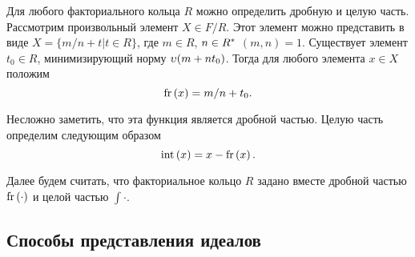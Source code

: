 \documentclass[_00_dissertation.tex]{subfiles}
\begin{document}
\begin{remark}\label{remark:easy_fr}
    Для любого факториального кольца $R$ можно определить дробную и целую часть.
    Рассмотрим произвольный элемент $X \in F/R$.
    Этот элемент можно представить в виде $X = \{m/n + t | t \in R\}$, где $m \in R$, $n \in R^{*}$ $(m, n) = 1$.
    Существует элемент $t_0 \in R$, минимизирующий норму $\upsilon(m + n t_0)$.
    Тогда для любого элемента $x \in X$ положим
    \begin{equation*}
        \textrm{fr}\left(x\right) = m/n + t_0.
    \end{equation*}

    Несложно заметить, что эта функция является дробной частью.
    Целую часть определим следующим образом
    \begin{equation*}
        \textrm{int}\left(x\right) = x - \textrm{fr}\left(x\right).
    \end{equation*}
\end{remark}

Далее будем считать, что факториальное кольцо $R$ задано вместе дробной частью $\textrm{fr}\left(\cdot\right)$ и целой частью $\int{\cdot}$.

\subsection{Способы представления идеалов}



    

\end{document}
